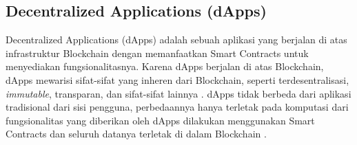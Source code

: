 \subsection{Decentralized Applications (dApps)}
\label{subsec:dapps}

Decentralized Applications (dApps) adalah sebuah aplikasi yang berjalan di atas infrastruktur Blockchain dengan memanfaatkan Smart Contracts untuk menyediakan fungsionalitasnya. Karena dApps berjalan di atas Blockchain, dApps mewarisi sifat-sifat yang inheren dari Blockchain, seperti terdesentralisasi, \textit{immutable}, transparan, dan sifat-sifat lainnya \parencite{investopedia2024}. dApps tidak berbeda dari aplikasi tradisional dari sisi pengguna, perbedaannya hanya terletak pada komputasi dari fungsionalitas yang diberikan oleh dApps dilakukan menggunakan Smart Contracts dan seluruh datanya terletak di dalam Blockchain \parencite{metcalfe2020ethereum}. 

